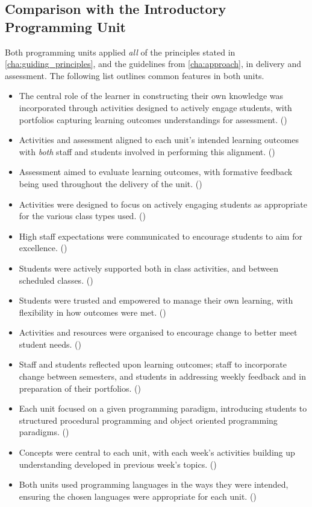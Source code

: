 \subsection{Comparison with the Introductory Programming Unit} %
\label{sub:comparison_with_the_introductory_programming_unit}

Both programming units applied \emph{all} of the principles stated in \cref{cha:guiding_principles}, and the guidelines from \cref{cha:approach}, in delivery and assessment. The following list outlines common features in both units. 
\begin{itemize}[noitemsep,nolistsep]
	\item The central role of the learner in constructing their own knowledge was incorporated through activities designed to actively engage students, with portfolios capturing learning outcomes understandings for assessment. ()
	\item Activities and assessment aligned to each unit's intended learning outcomes with \emph{both} staff and students involved in performing this alignment. ()
	\item Assessment aimed to evaluate learning outcomes, with formative feedback being used throughout the delivery of the unit. ()
	\item Activities were designed to focus on actively engaging students as appropriate for the various class types used.  ()
	\item High staff expectations were communicated to encourage students to aim for excellence. ()
	\item Students were actively supported both in class activities, and between scheduled classes. ()
	\item Students were trusted and empowered to manage their own learning, with flexibility in how outcomes were met. ()
	\item Activities and resources were organised to encourage change to better meet student needs. ()
	\item Staff and students reflected upon learning outcomes; staff to incorporate change between semesters, and students in addressing weekly feedback and in preparation of their portfolios. ()
	\item Each unit focused on a given programming paradigm, introducing students to structured procedural programming and object oriented programming paradigms. ()
	\item Concepts were central to each unit, with each week's activities building up understanding developed in previous week's topics. ()
	\item Both units used programming languages in the ways they were intended, ensuring the chosen languages were appropriate for each unit. ()
\end{itemize}

